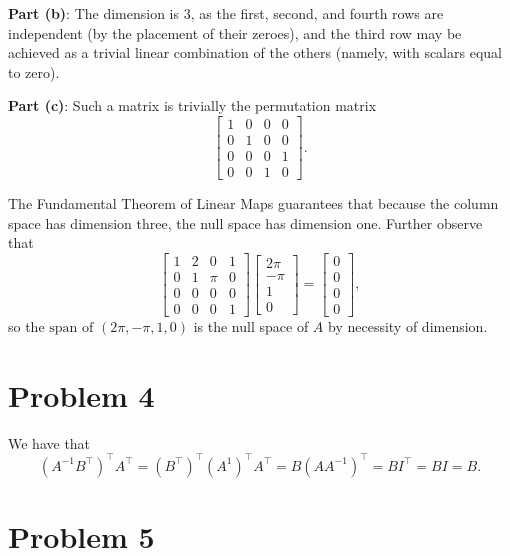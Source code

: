 \documentclass[11pt]{article}
\begin{document}
\textbf{Part (b)}: The dimension is $\boxed{3}$, as the first, second, and fourth rows are independent (by the placement of their zeroes), and the third row may be achieved as a trivial linear combination of the others (namely, with scalars equal to zero).

\textbf{Part (c)}: Such a matrix is trivially the permutation matrix
\[
	\begin{bmatrix} 1 & 0 & 0 & 0 \\ 0 & 1 & 0 & 0 \\ 0 & 0 & 0 & 1 \\ 0 & 0 & 1 & 0 \end{bmatrix}.
\]

The Fundamental Theorem of Linear Maps guarantees that because the column space has dimension three, the null space has dimension one. Further observe that 
\[
	\begin{bmatrix} 1 & 2 & 0 & 1 \\ 0 & 1 & \pi & 0 \\ 0 & 0 & 0 & 0 \\ 0 & 0 & 0 & 1 \end{bmatrix} \begin{bmatrix} 2\pi \\ -\pi \\ 1 \\ 0 \end{bmatrix} = \begin{bmatrix} 0 \\ 0 \\ 0 \\ 0 \end{bmatrix},
\]
so the $\boxed{\text{span of $(2\pi, -\pi, 1, 0)$}}$ is the null space of $A$ by necessity of dimension.


\section{Problem 4}

We have that
\[
	(A^{-1}B^{\top})^{\top} A^{\top} = (B^{\top})^{\top} (A^{1})^{\top} A^{\top} = B (A A^{-1})^{\top} = B I^{\top} = BI = \boxed{B}.
\]


\section{Problem 5}
\end{document}
